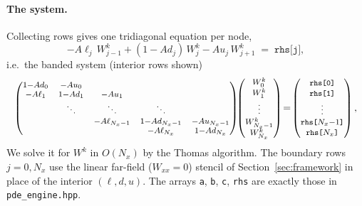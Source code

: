 \documentclass[11pt]{article}
\begin{document}
\paragraph{The system.} Collecting rows gives one tridiagonal equation per node,
\begin{equation}
  -A\ell_j\,W_{j-1}^{k} + (1-Ad_j)\,W_j^{k} - Au_j\,W_{j+1}^{k} \;=\; \texttt{rhs[j]},
\end{equation}
i.e.\ the banded system (interior rows shown)
\begin{equation}
\footnotesize
\begin{pmatrix}
1{-}Ad_0 & -Au_0 & & & \\
-A\ell_1 & 1{-}Ad_1 & -Au_1 & & \\
 & \ddots & \ddots & \ddots & \\
 & & -A\ell_{N_x-1} & 1{-}Ad_{N_x-1} & -Au_{N_x-1}\\
 & & & -A\ell_{N_x} & 1{-}Ad_{N_x}
\end{pmatrix}
\!\!
\begin{pmatrix} W_0^{k}\\[1pt] W_1^{k}\\[1pt] \vdots\\[1pt] W_{N_x-1}^{k}\\[1pt] W_{N_x}^{k}\end{pmatrix}
\!=\!
\begin{pmatrix} \texttt{rhs[0]}\\[1pt] \texttt{rhs[1]}\\[1pt] \vdots\\[1pt] \texttt{rhs[$N_x{-}1$]}\\[1pt] \texttt{rhs[$N_x$]}\end{pmatrix},
\end{equation}
We solve it for $W^{k}$ in $O(N_x)$ by the Thomas algorithm. The boundary rows $j=0,N_x$ use the
linear far-field ($W_{xx}=0$) stencil of Section~\ref{sec:framework} in place of the interior
$(\ell,d,u)$. The arrays \texttt{a}, \texttt{b}, \texttt{c}, \texttt{rhs} are exactly those in
\texttt{pde\_engine.hpp}.

\end{document}

